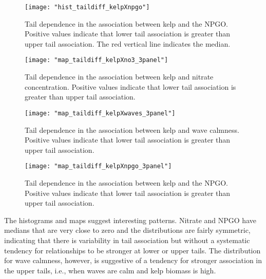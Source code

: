 \documentclass[12pt, oneside]{article}
\begin{document}
\begin{figure}
    \centering
    \texttt{[image: "hist\_taildiff\_kelpXnpgo"]}
    \caption{Tail dependence in the association between kelp and the NPGO. Positive values indicate that lower tail association is greater than upper tail association.
    The red vertical line indicates the median.}
    \label{fig:hist_taildiff_kelpXnpgo}
\end{figure}

\begin{figure}
    \centering
    \texttt{[image: "map\_taildiff\_kelpXno3\_3panel"]}
    \caption{Tail dependence in the association between kelp and nitrate concentration. Positive values indicate that lower tail association is greater than upper tail association.}
    \label{fig:taildiff_kelpXno3}
\end{figure}

\begin{figure}
    \centering
    \texttt{[image: "map\_taildiff\_kelpXwaves\_3panel"]}
    \caption{Tail dependence in the association between kelp and wave calmness. Positive values indicate that lower tail association is greater than upper tail association.}
    \label{fig:taildiff_kelpXwaves}
\end{figure}

\begin{figure}
    \centering
    \texttt{[image: "map\_taildiff\_kelpXnpgo\_3panel"]}
    \caption{Tail dependence in the association between kelp and the NPGO. Positive values indicate that lower tail association is greater than upper tail association.}
    \label{fig:taildiff_kelpXnpgo}
\end{figure}

The histograms and maps suggest interesting patterns. 
Nitrate and NPGO have medians that are very close to zero and the distributions are fairly symmetric, indicating that there is variability in tail association but without a systematic tendency for relationships to be stronger at lower or upper tails. 
The distribution for wave calmness, however, is suggestive of a tendency for stronger association in the upper tails, i.e., when waves are calm and kelp biomass is high. 
\end{document}
